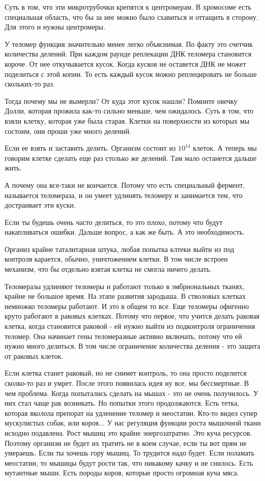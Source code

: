 Суть в том, что эти микротрубочки крепятся к
центромерам. В хромосоме есть
специальная область, что бы за нее можно
было схавиться и оттащить в сторону.
Для этого и нужны центромеры.

У теломер функция значительно менее легко объяснимая.
По факту это счетчик количества делений.
При каждом раунде реплекации ДНК теломера становится
короче. От нее откучывается кусок. Когда
кусков не оставется ДНК не может поделиться с этой копии.
То есть каждый кусок можно
реплецировать не больше скольких-то раз.

Тогда почему мы не вымерли?
От куда этот кусок нашли? Помните овечку Долли, которая прожила как-то
сильно меньше, чем ожидалось. Суть в том, что взяли клетку,
которая уже была старая. Клетки на поверхности из
которых мы состоим, они проши уже много делений.

Если ее взять и заставить делить. Организм состоит из $10^14$ клеток.
А теперь мы говорим клетке сделать еще раз столько же
делений. Там мало останется дальше жить.

А почему она все-таки не кончается. Потому что есть специальный
фермент, называется теломераза, и он умеет удлинять теломеру и занимается
тем, что достраивает эти куски.

Если ты будешь очень часто делиться, то это плохо,
потому что будут накапливаться ошибки. Дальше вопрос,
а как же быть. А это необходимость.

Организ крайне таталитарная штука, любая попытка клтеки
выйти из под контроля карается, обычно,
уничтожением клетки. В том числе встроен механизм, что бы
отдельно взятая клетка не смогла ничего делать.

Теломеразы удлиняют теломеры и работают только в эмбриональных
тканях, крайне не большое время. На этапе развития зародыша.
В стволовых клетках немножко теломеры работают.
И это в общем то все. Еще теломеры офигенно круто работают в
раковых клетках. Потому что первое,
что учится делать раковая клетка, когда становится раковой -
ей нужно выйти из подконтроля ограничения теломер. Она
начинает гены теломеразные активно включать,
потому что ей нужно много делиться. В том числе
ограничение количества деления - это
защита от раковых клеток.

Если клетка станет раковый, но не снимет контроль, то она просто
поделится сколко-то раз и умрет.
После этого появилась идея ну все, мы бессмертные. В чем проблема.
Когда попытались сделать на мышах - это не очень получилось.
У них стал чаще рак возникать. Но попытки этого продолжаются.
Есть тетка, которая вколола препорат на удленение теломер и меостатин.
Кто-то видел супер мускулистых собак, или коров... У нас регуляция
функции роста мышочной ткани исходно подавлена. Рост мышиц это
крайне энергозатратно. Это куча ресурсов. Поэтому организм не будет
их тратить не в коем случае, если ты вот прям не умераешь. Если ты 
хочешь гору мышиц. То трудится надо будет. Если поламать меостатин, 
то мышицы будут рости так, что никакому качку и не снилось. 
Есть мутантные мыши. Есть породы коров, которые просто огромная куча мяса. 

